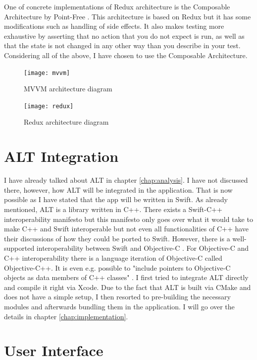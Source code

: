 One of concrete implementations of Redux architecture is the Composable Architecture by Point-Free \cite{tca}. This architecture is based on Redux but it has some modifications such as handling of side effects. It also makes testing more exhaustive by asserting that no action that you do not expect is run, as well as that the state is not changed in any other way than you describe in your test. Considering all of the above, I have chosen to use the Composable Architecture. 

\begin{figure}
    \texttt{[image: mvvm]}
    \caption{MVVM architecture diagram \cite{mvvm}}\label{mvvm}
\end{figure}

\begin{figure}
    \texttt{[image: redux]}
    \caption{Redux architecture diagram \cite{react-redux}}\label{redux}
\end{figure}

\section{ALT Integration}

I have already talked about ALT in chapter \ref{chap:analysis}. I have not discussed there, however, how ALT will be integrated in the application. That is now possible as I have stated that the app will be written in Swift. As already mentioned, ALT is a library written in C++. There exists a Swift-C++ interoperability manifesto \cite{swift-c++-manifesto} but this manifesto only goes over what it would take to make C++ and Swift interoperable but not even all functionalities of C++ have their discussions of how they could be ported to Swift. However, there is a well-supported interoperability between Swift and Objective-C \cite{swift-objc-interoperability}. For Objective-C and C++ interoperability there is a language iteration of Objective-C called Objective-C++. It is even e.g. possible to "include pointers to Objective-C objects as data members of C++ classes" \cite{objc++}. I first tried to integrate ALT directly and compile it right via Xcode. Due to the fact that ALT is built via CMake \cite{cmake} and does not have a simple setup, I then resorted to pre-building the necessary modules and afterwards bundling them in the application. I will go over the details in chapter \ref{chap:implementation}.

\section{User Interface}


